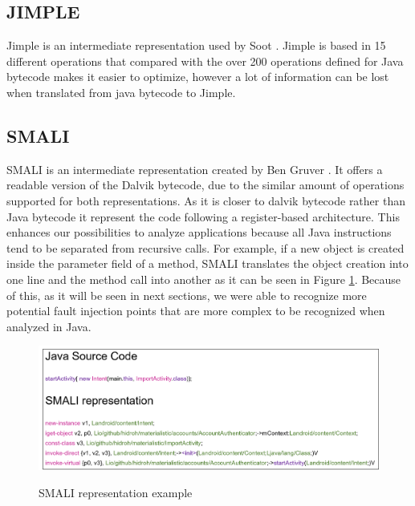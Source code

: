 \subsection{JIMPLE}

Jimple is an intermediate representation used by Soot \cite{soot}. Jimple is based in 15 different operations that compared with the over 200 operations defined for Java bytecode makes it easier to optimize, however a lot of information can be lost when translated from java bytecode to Jimple.

\subsection{SMALI}

SMALI is an intermediate representation created by Ben Gruver \cite{smali}. It offers a readable version of the Dalvik bytecode, due to the similar amount of operations supported for both representations. As it is closer to dalvik bytecode rather than Java bytecode it represent the code following a register-based architecture. This enhances our possibilities to analyze applications because all Java instructions tend to be separated from recursive calls. For example, if a new object is created inside the parameter field of a method, SMALI translates the object creation into one line and the method call into another as it can be seen in Figure \ref{fig:sre}. Because of this, as it will be seen in next sections, we were able to recognize more potential fault injection points that are more complex to be recognized when analyzed in Java.

\begin{figure}[H]
	\caption{SMALI representation example}
	\centering
	\includegraphics[width=\textwidth]{../Figures/smali}
	\label{fig:sre}
\end{figure}


